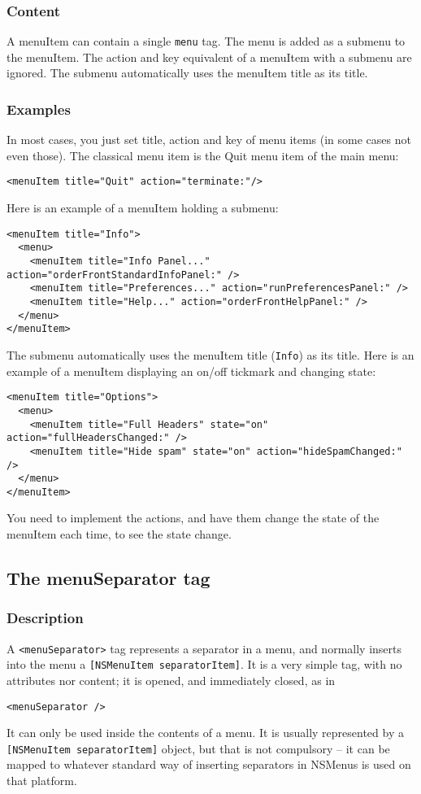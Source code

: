 \subsubsection{Content}
A menuItem can contain a single \texttt{menu} tag.  The menu is added
as a submenu to the menuItem.  The action and key equivalent of a
menuItem with a submenu are ignored.  The submenu automatically uses
the menuItem title as its title.

\subsubsection{Examples}
In most cases, you just set title, action and key of menu items (in
some cases not even those).  The classical menu item is the Quit menu
item of the main menu:
\begin{verbatim}
<menuItem title="Quit" action="terminate:"/>
\end{verbatim}
Here is an example of a menuItem holding a submenu:
\begin{verbatim}
<menuItem title="Info">
  <menu>
    <menuItem title="Info Panel..." action="orderFrontStandardInfoPanel:" />
    <menuItem title="Preferences..." action="runPreferencesPanel:" />
    <menuItem title="Help..." action="orderFrontHelpPanel:" />
  </menu>
</menuItem>
\end{verbatim}
The submenu automatically uses the menuItem title (\texttt{Info}) as
its title.  Here is an example of a menuItem displaying an on/off tickmark
and changing state:
\begin{verbatim}
<menuItem title="Options">
  <menu>
    <menuItem title="Full Headers" state="on" action="fullHeadersChanged:" />
    <menuItem title="Hide spam" state="on" action="hideSpamChanged:" />
  </menu>
</menuItem>
\end{verbatim}
You need to implement the actions, and have them change the state of the
menuItem each time, to see the state change.

\subsection{The menuSeparator tag}

\subsubsection{Description}
A \texttt{<menuSeparator>} tag represents a separator in a menu, and
normally inserts into the menu a \texttt{[NSMenuItem separatorItem]}.
It is a very simple tag, with no attributes nor content; it is opened,
and immediately closed, as in
\begin{verbatim}
<menuSeparator />
\end{verbatim}
It can only be used inside the contents of a menu.  It is usually
represented by a \texttt{[NSMenuItem separatorItem]} object, but that
is not compulsory -- it can be mapped to whatever standard way of
inserting separators in NSMenus is used on that platform.

